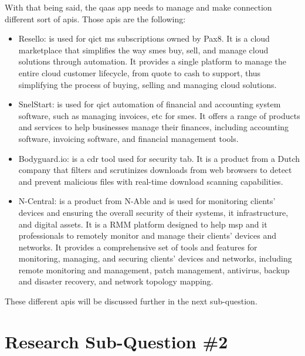 \begin{multicols}{2}
      With that being said, the \acrshort{qaas} app needs to manage and make connection different sort of \acrshort{api}s.
      Those \acrshort{api}s are the following:
      \begin{itemize}
            \item Resello: is used for \acrshort{qict} \acrshort{ms} subscriptions owned by Pax8. It is a cloud
                  marketplace that simplifies the way \acrshort{sme}s buy, sell, and manage cloud solutions through
                  automation. It provides a single platform to manage the entire cloud customer lifecycle, from
                  quote to cash to support, thus simplifying the process of buying, selling and managing cloud
                  solutions.
            \item SnelStart: is used for \acrshort{qict} automation of financial and accounting system software,
                  such as managing invoices, \acrshort{etc} for \acrshort{sme}s. It offers a range of products and
                  services to help businesses manage their finances, including accounting software, invoicing software,
                  and financial management tools.
            \item Bodyguard.io: is a \acrshort{cdr} tool used for security tab. It is a product from a Dutch company
                  that filters and scrutinizes downloads from web browsers to detect and prevent malicious files with
                  real-time download scanning capabilities.
            \item N-Central: is a product from N-Able and is used for monitoring clients' devices and ensuring the
                  overall security of their systems, \acrshort{it} infrastructure, and digital assets. It is a
                  \gls{RMM} platform designed to help \acrshort{msp} and \acrshort{it} professionals to
                  remotely monitor and manage their clients' devices and networks. It provides a comprehensive
                  set of tools and features for monitoring, managing, and securing clients' devices and networks,
                  including remote monitoring and management, patch management, antivirus, backup and disaster
                  recovery, and network topology mapping.
      \end{itemize}
      These different \acrshort{api}s will be discussed further in the next sub-question.
      \section{Research Sub-Question \#2}

\end{multicols}
